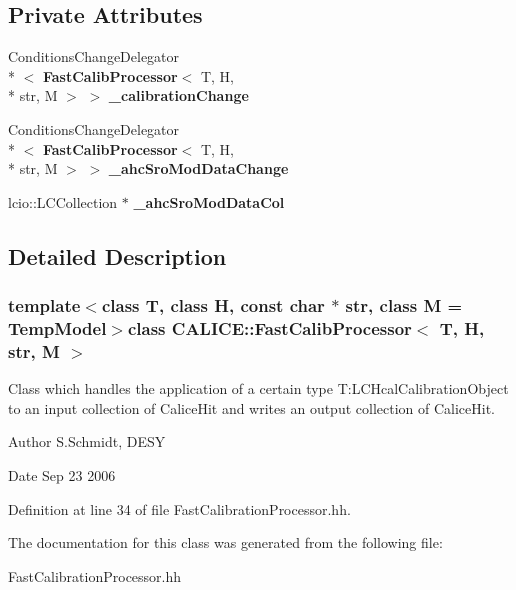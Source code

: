 \subsection*{Private Attributes}
\begin{DoxyCompactItemize}
\item 
Conditions\-Change\-Delegator\\*
$<$ {\bf Fast\-Calib\-Processor}$<$ T, H, \\*
str, M $>$ $>$ {\bfseries \-\_\-calibration\-Change}\label{classCALICE_1_1FastCalibProcessor_ae17b4d2b8c9107594ae92e70dcf2983d}

\item 
Conditions\-Change\-Delegator\\*
$<$ {\bf Fast\-Calib\-Processor}$<$ T, H, \\*
str, M $>$ $>$ {\bfseries \-\_\-ahc\-Sro\-Mod\-Data\-Change}\label{classCALICE_1_1FastCalibProcessor_a132d6fff627c0b45c1e98fc9d5a28146}

\item 
lcio\-::\-L\-C\-Collection $\ast$ {\bfseries \-\_\-ahc\-Sro\-Mod\-Data\-Col}\label{classCALICE_1_1FastCalibProcessor_ad11ad45f2892496a8582b31aea2f0fcb}

\end{DoxyCompactItemize}


\subsection{Detailed Description}
\subsubsection*{template$<$class T, class H, const char $\ast$ str, class M = Temp\-Model$>$class C\-A\-L\-I\-C\-E\-::\-Fast\-Calib\-Processor$<$ T, H, str, M $>$}

Class which handles the application of a certain type T\-:L\-C\-Hcal\-Calibration\-Object to an input collection of Calice\-Hit and writes an output collection of Calice\-Hit. 

\begin{DoxyAuthor}{Author}
S.\-Schmidt, D\-E\-S\-Y 
\end{DoxyAuthor}
\begin{DoxyDate}{Date}
Sep 23 2006 
\end{DoxyDate}


Definition at line 34 of file Fast\-Calibration\-Processor.\-hh.



The documentation for this class was generated from the following file\-:\begin{DoxyCompactItemize}
\item 
Fast\-Calibration\-Processor.\-hh\end{DoxyCompactItemize}
